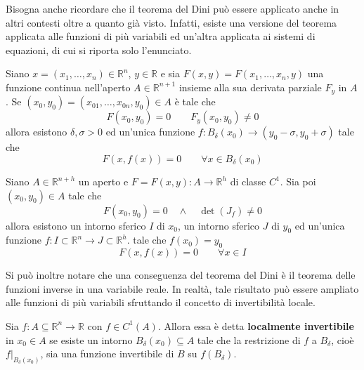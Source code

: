 Bisogna anche ricordare che il teorema del Dini può essere applicato anche in altri contesti oltre a quanto già visto. Infatti, esiste una versione del teorema applicata alle funzioni di più variabili ed un'altra applicata ai sistemi di equazioni, di cui si riporta solo l'enunciato.
\begin{theorem}
Siano $x=(x_1, \dots, x_n) \in \mathbb{R}^n$, $y \in \mathbb{R}$ e sia $F(x, y)=F(x_1, \dots, x_n, y)$ una funzione continua nell'aperto $A \in \mathbb{R}^{n+1}$ insieme alla sua derivata parziale $F_y$ in $A$. Se $(x_0, y_0)=(x_{01}, \dots, x_{0n}, y_0)\in A$ è tale che
\begin{equation*}
    F(x_0, y_0)=0 \qquad F_y(x_0, y_0) \neq 0
\end{equation*}
allora esistono $\delta, \sigma>0$ ed un'unica funzione $f: B_\delta(x_0) \to (y_0-\sigma, y_0+ \sigma)$ tale che 
\begin{equation*}
    F(x, f(x))=0 \qquad \forall x \in B_\delta(x_0)
\end{equation*}
\end{theorem}
\begin{theorem}
    Siano $A \in \mathbb{R}^{n+h}$ un aperto e $F=F(x,y): A \to \mathbb{R}^h$ di classe $C^1$. Sia poi $(x_0, y_0) \in A$ tale che
    \begin{equation*}
        F(x_0, y_0)=0\quad \land \quad \det(J_f) \neq 0
    \end{equation*}
    allora esistono un intorno sferico $I$ di $x_0$, un intorno sferico $J$ di $y_0$ ed un'unica funzione $f: I \subset \mathbb{R}^n \to J \subset\mathbb{R}^h$. tale che $f(x_0)=y_0$
    \begin{equation*}
        F(x, f(x))=0 \qquad \forall x \in I
    \end{equation*}
\end{theorem}
Si può inoltre notare che una conseguenza del teorema del Dini è il teorema delle funzioni inverse in una variabile reale. In realtà, tale risultato può essere ampliato alle funzioni di più variabili sfruttando il concetto di invertibilità locale.
\begin{definition} \label{Def: Invertibilità locale}
    Sia $f: A \subseteq \mathbb{R}^n \to \mathbb{R}$ con $f \in C^1(A)$. Allora essa è detta \textbf{localmente invertibile} in $x_0 \in A$ se esiste un intorno $B_\delta(x_0) \subseteq A$ tale che la restrizione di $f$ a $B_\delta$, cioè $f\big|_{B_\delta(x_0)}$, sia una funzione invertibile di $B$ su $f(B_\delta)$.
\end{definition}

